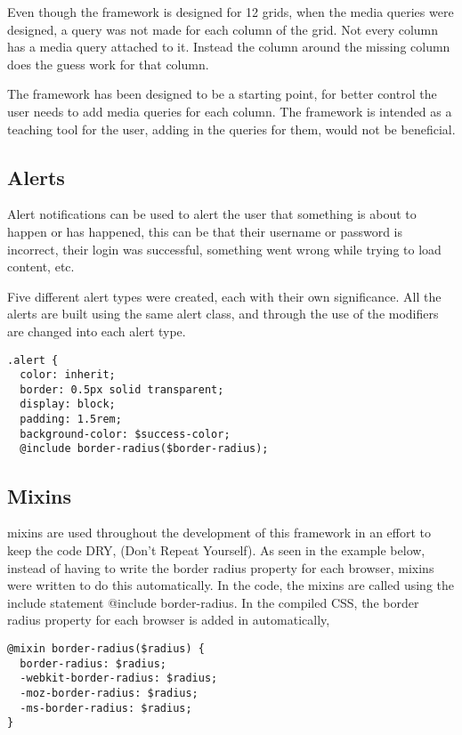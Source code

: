 Even though the framework is designed for 12 grids, when the media queries were designed, a query was not made for each column of the grid. Not every column has a media query attached to it. Instead the column around the missing column does the guess work for that column. 

The framework has been designed to be a starting point, for better control the user needs to add media queries for each column. The framework is intended as a teaching tool for the user, adding in the queries for them, would not be beneficial. 

\newpage
\subsection*{Alerts}
Alert notifications can be used to alert the user that something is about to happen or has happened, this can be that their username or password is incorrect, their login was successful, something went wrong while trying to load content, etc.

Five different alert types were created, each with their own significance. All the alerts are built using the same alert class, and through the use of the modifiers are changed into each alert type. 

\begin{lstlisting}[language=CSS3]
.alert {
  color: inherit;
  border: 0.5px solid transparent;
  display: block;
  padding: 1.5rem;
  background-color: $success-color;
  @include border-radius($border-radius);
\end{lstlisting}

\subsection*{Mixins}
\gls{mixins} are used throughout the development of this framework in an effort to keep the code \gls{DRY}, (Don't Repeat Yourself). As seen in the example below, instead of having to write the border radius property for each browser, \gls{mixins} were written to do this automatically. In the code, the \gls{mixins} are called using the include statement @include border-radius. In the compiled \gls{CSS}, the border radius property for each browser is added in automatically, 

\begin{lstlisting}[language=CSS3]
@mixin border-radius($radius) {
  border-radius: $radius;
  -webkit-border-radius: $radius;
  -moz-border-radius: $radius;
  -ms-border-radius: $radius;
}
\end{lstlisting}

